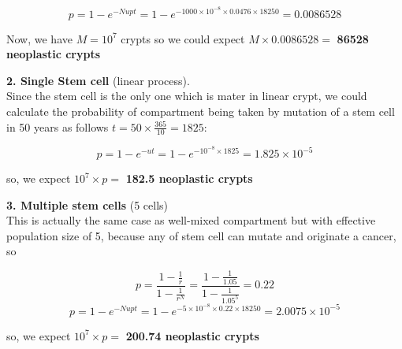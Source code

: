 \[ p=1-e^{-Nupt}=1-e^{-1000\times10^{-8}\times0.0476\times18250}=0.0086528 \]

Now, we have $M=10^7$ crypts so we could expect $M \times 0.0086528 =$  \textbf{86528 neoplastic crypts}

\textbf{2. Single Stem cell} (linear process). \\

Since the stem cell is the only one which is mater in linear crypt, we could calculate the probability of compartment being taken by mutation of a stem cell in 50 years as follows $t = 50\times\frac{365}{10}=1825 $:

\[ p=1-e^{-ut}=1-e^{-10^{-8}\times1825}=1.825\times10^{-5} \]

so, we expect $10^7 \times p =$  \textbf{182.5 neoplastic crypts}

\textbf{3.	Multiple stem cells} (5 cells)\\

 This is actually the same case as well-mixed compartment but with effective population size of 5, because any of stem cell can mutate and originate a cancer, so 

\[ p = \frac{1-\frac{1}{r}}{1 - \frac{1}{r^N}} = \frac{1-\frac{1}{1.05}}{1-\frac{1}{1.05^{5}}} = 0.22  \]
\[ p=1-e^{-Nupt}=1-e^{-5\times10^{-8}\times0.22\times18250}=2.0075\times10^{-5} \]

so, we expect $10^7 \times p = $ \textbf{200.74 neoplastic crypts}
\setcounter{chapter}{3}
\setcounter{section}{0}
